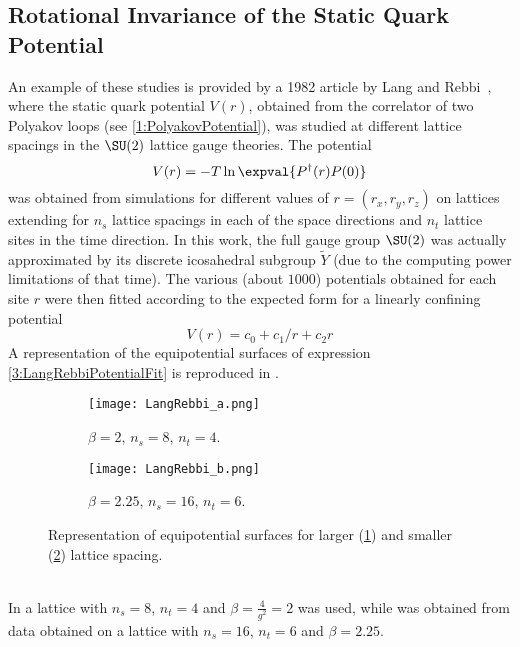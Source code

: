 \subsection{Rotational Invariance of the Static Quark Potential\label{Sec3:RotInv}}
An example of these studies is provided by a 1982 article by Lang and Rebbi~\cite{Lang:1982tj}, where the static quark potential $V(r)$, obtained from the correlator of two Polyakov loops (see \eqref{1:PolyakovPotential}), was studied at different lattice spacings in the $\SU(2)$ lattice gauge theories. The potential
\begin{equation}
    V(r) = -T\ln\expval{P^\dagger(r)P(0)} \label{3:LangRebbiPotential}
\end{equation}
was obtained from simulations for different values of $r=(r_x, r_y, r_z)$ on lattices extending for $n_s$ lattice spacings in each of the space directions and $n_t$ lattice sites in the time direction.
In this work, the full gauge group $\SU(2)$ was actually approximated by its discrete icosahedral subgroup $\tilde{Y}$ (due to the computing power limitations of that time).
The various (about $1000$) potentials obtained for each site $r$ were then fitted according to the expected form for a linearly confining potential
\begin{equation}
    V(r) = c_0 + c_1/r + c_2r \label{3:LangRebbiPotentialFit}
\end{equation}
A representation of the equipotential surfaces of expression \eqref{3:LangRebbiPotentialFit} is reproduced in .
\begin{figure}[!htbp]
    \centering
    \hfill
    \begin{subfigure}[b]{0.45\textwidth}
        \centering
        \texttt{[image: LangRebbi\_a.png]}
        \caption{$\beta=2$, $n_s=8$, $n_t=4$.}
        \label{3F:LangRebbiA}
    \end{subfigure}
    \begin{subfigure}[b]{0.45\textwidth}
        \centering
        \texttt{[image: LangRebbi\_b.png]}
        \caption{$\beta=2.25$, $n_s=16$, $n_t=6$.}
        \label{3F:LangRebbiB}
    \end{subfigure}
    \hfill
    \caption{Representation of equipotential surfaces for larger (\ref{3F:LangRebbiA}) and smaller (\ref{3F:LangRebbiB}) lattice spacing.}
    \label{3F:LangRebbi}
\end{figure}\\
In  a lattice with $n_s=8$, $n_t=4$ and $\beta=\frac4{g^2}=2$ was used, while  was obtained from data obtained on a lattice with $n_s=16$, $n_t=6$ and $\beta=2.25$.
